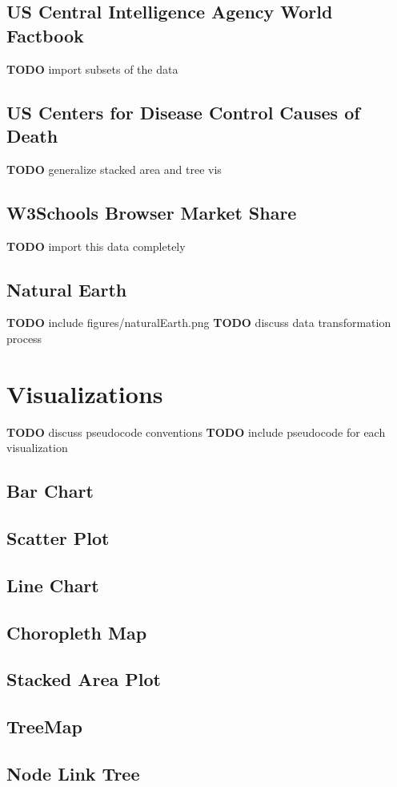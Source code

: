 \documentclass[12pt]{article}
\newcommand{\TODO}[1]{{ \color{red}\textbf{TODO} #1 }}
\begin{document}
\begin{doublespace}
\subsection{US Central Intelligence Agency World Factbook}
\TODO{ import subsets of the data}
\subsection{US Centers for Disease Control Causes of Death}
\TODO{ generalize stacked area and tree vis}
\subsection{W3Schools Browser Market Share}
\TODO{ import this data completely}
\subsection{Natural Earth}
\TODO{ include figures/naturalEarth.png}
\TODO{ discuss data transformation process}

\pagebreak
\section{Visualizations}
\TODO{ discuss pseudocode conventions}
\TODO{ include pseudocode for each visualization}
\subsection{Bar Chart}
\subsection{Scatter Plot}
\subsection{Line Chart}
\subsection{Choropleth Map}
\subsection{Stacked Area Plot}
\subsection{TreeMap}
\subsection{Node Link Tree}

\end{doublespace}
\end{document}
